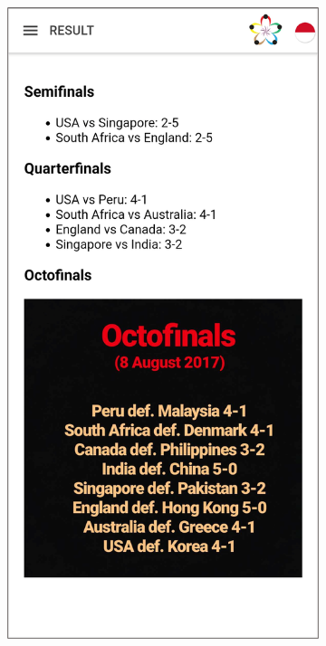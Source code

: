 \begin{figure}[H]
     \centering
     \begin{subfigure}[b]{0.3\textwidth}
         \centering
         \includegraphics[width=\textwidth]{Gambar/SSResult.png}

\end{subfigure}
\end{figure}
